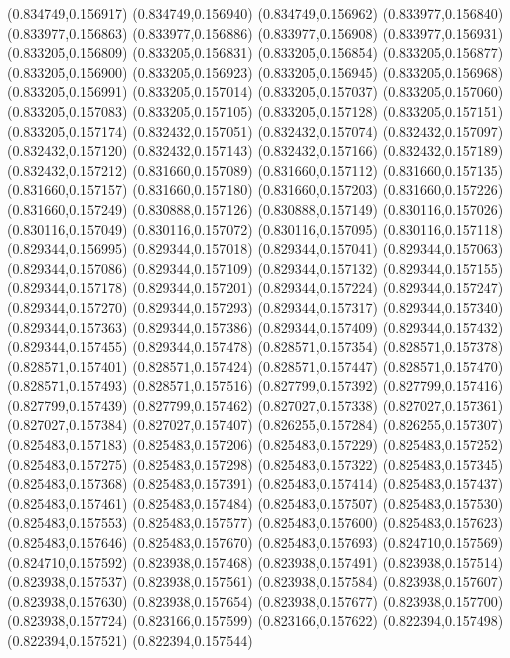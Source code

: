 (0.834749,0.156917)
(0.834749,0.156940)
(0.834749,0.156962)
(0.833977,0.156840)
(0.833977,0.156863)
(0.833977,0.156886)
(0.833977,0.156908)
(0.833977,0.156931)
(0.833205,0.156809)
(0.833205,0.156831)
(0.833205,0.156854)
(0.833205,0.156877)
(0.833205,0.156900)
(0.833205,0.156923)
(0.833205,0.156945)
(0.833205,0.156968)
(0.833205,0.156991)
(0.833205,0.157014)
(0.833205,0.157037)
(0.833205,0.157060)
(0.833205,0.157083)
(0.833205,0.157105)
(0.833205,0.157128)
(0.833205,0.157151)
(0.833205,0.157174)
(0.832432,0.157051)
(0.832432,0.157074)
(0.832432,0.157097)
(0.832432,0.157120)
(0.832432,0.157143)
(0.832432,0.157166)
(0.832432,0.157189)
(0.832432,0.157212)
(0.831660,0.157089)
(0.831660,0.157112)
(0.831660,0.157135)
(0.831660,0.157157)
(0.831660,0.157180)
(0.831660,0.157203)
(0.831660,0.157226)
(0.831660,0.157249)
(0.830888,0.157126)
(0.830888,0.157149)
(0.830116,0.157026)
(0.830116,0.157049)
(0.830116,0.157072)
(0.830116,0.157095)
(0.830116,0.157118)
(0.829344,0.156995)
(0.829344,0.157018)
(0.829344,0.157041)
(0.829344,0.157063)
(0.829344,0.157086)
(0.829344,0.157109)
(0.829344,0.157132)
(0.829344,0.157155)
(0.829344,0.157178)
(0.829344,0.157201)
(0.829344,0.157224)
(0.829344,0.157247)
(0.829344,0.157270)
(0.829344,0.157293)
(0.829344,0.157317)
(0.829344,0.157340)
(0.829344,0.157363)
(0.829344,0.157386)
(0.829344,0.157409)
(0.829344,0.157432)
(0.829344,0.157455)
(0.829344,0.157478)
(0.828571,0.157354)
(0.828571,0.157378)
(0.828571,0.157401)
(0.828571,0.157424)
(0.828571,0.157447)
(0.828571,0.157470)
(0.828571,0.157493)
(0.828571,0.157516)
(0.827799,0.157392)
(0.827799,0.157416)
(0.827799,0.157439)
(0.827799,0.157462)
(0.827027,0.157338)
(0.827027,0.157361)
(0.827027,0.157384)
(0.827027,0.157407)
(0.826255,0.157284)
(0.826255,0.157307)
(0.825483,0.157183)
(0.825483,0.157206)
(0.825483,0.157229)
(0.825483,0.157252)
(0.825483,0.157275)
(0.825483,0.157298)
(0.825483,0.157322)
(0.825483,0.157345)
(0.825483,0.157368)
(0.825483,0.157391)
(0.825483,0.157414)
(0.825483,0.157437)
(0.825483,0.157461)
(0.825483,0.157484)
(0.825483,0.157507)
(0.825483,0.157530)
(0.825483,0.157553)
(0.825483,0.157577)
(0.825483,0.157600)
(0.825483,0.157623)
(0.825483,0.157646)
(0.825483,0.157670)
(0.825483,0.157693)
(0.824710,0.157569)
(0.824710,0.157592)
(0.823938,0.157468)
(0.823938,0.157491)
(0.823938,0.157514)
(0.823938,0.157537)
(0.823938,0.157561)
(0.823938,0.157584)
(0.823938,0.157607)
(0.823938,0.157630)
(0.823938,0.157654)
(0.823938,0.157677)
(0.823938,0.157700)
(0.823938,0.157724)
(0.823166,0.157599)
(0.823166,0.157622)
(0.822394,0.157498)
(0.822394,0.157521)
(0.822394,0.157544)

